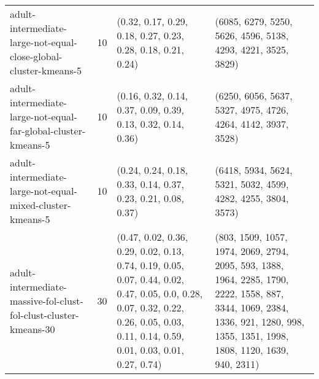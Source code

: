 \begin{longtable}{llll}
                                             adult-intermediate-large-not-equal-close-global-cluster-kmeans-5 &             10 &                                                                                                                                                                                                                                              (0.32, 0.17, 0.29, 0.18, 0.27, 0.23, 0.28, 0.18, 0.21, 0.24) &                                                                                                                                                                                                                                              (6085, 6279, 5250, 5626, 4596, 5138, 4293, 4221, 3525, 3829) \\
                                               adult-intermediate-large-not-equal-far-global-cluster-kmeans-5 &             10 &                                                                                                                                                                                                                                              (0.16, 0.32, 0.14, 0.37, 0.09, 0.39, 0.13, 0.32, 0.14, 0.36) &                                                                                                                                                                                                                                              (6250, 6056, 5637, 5327, 4975, 4726, 4264, 4142, 3937, 3528) \\
                                                    adult-intermediate-large-not-equal-mixed-cluster-kmeans-5 &             10 &                                                                                                                                                                                                                                              (0.24, 0.24, 0.18, 0.33, 0.14, 0.37, 0.23, 0.21, 0.08, 0.37) &                                                                                                                                                                                                                                              (6418, 5934, 5624, 5321, 5032, 4599, 4282, 4255, 3804, 3573) \\
                                             adult-intermediate-massive-fol-clust-fol-clust-cluster-kmeans-30 &             30 &                                                                                                                       (0.47, 0.02, 0.36, 0.29, 0.02, 0.13, 0.74, 0.19, 0.05, 0.07, 0.44, 0.02, 0.47, 0.05, 0.0, 0.28, 0.07, 0.32, 0.22, 0.26, 0.05, 0.03, 0.11, 0.14, 0.59, 0.01, 0.03, 0.01, 0.27, 0.74) &                                                                                                                            (803, 1509, 1057, 1974, 2069, 2794, 2095, 593, 1388, 1964, 2285, 1790, 2222, 1558, 887, 3344, 1069, 2384, 1336, 921, 1280, 998, 1355, 1351, 1998, 1808, 1120, 1639, 940, 2311) \\

\end{longtable}
